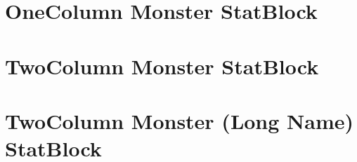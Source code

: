 \documentclass[letterpaper,openany,oneside,twocolumn]{book}
\begin{document}
	\chapter*{OneColumn Monster StatBlock}
	
	\clearpage
	\chapter*{TwoColumn Monster StatBlock}
	
	\clearpage
	\chapter*{TwoColumn Monster (Long Name) StatBlock}
	
\end{document}

